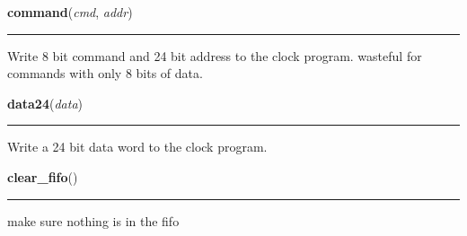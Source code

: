     \vspace{0.5ex}

    \begin{boxedminipage}{\textwidth}

    \raggedright \textbf{command}(\textit{cmd}, \textit{addr})

    \vspace{-1.5ex}

    \rule{\textwidth}{0.5\fboxrule}
    Write 8 bit command and 24 bit address to the clock program. wasteful 
    for commands with only 8 bits of data.

    \vspace{1ex}

    \end{boxedminipage}

    \label{ociw:data24}

    \vspace{0.5ex}

    \begin{boxedminipage}{\textwidth}

    \raggedright \textbf{data24}(\textit{data})

    \vspace{-1.5ex}

    \rule{\textwidth}{0.5\fboxrule}
    Write a 24 bit data word to the clock program.

    \vspace{1ex}

    \end{boxedminipage}

    \label{ociw:clear_fifo}

    \vspace{0.5ex}

    \begin{boxedminipage}{\textwidth}

    \raggedright \textbf{clear\_fifo}()

    \vspace{-1.5ex}

    \rule{\textwidth}{0.5\fboxrule}
    make sure nothing is in the fifo

    \vspace{1ex}

    \end{boxedminipage}

    \label{ociw:peek_fifo}

